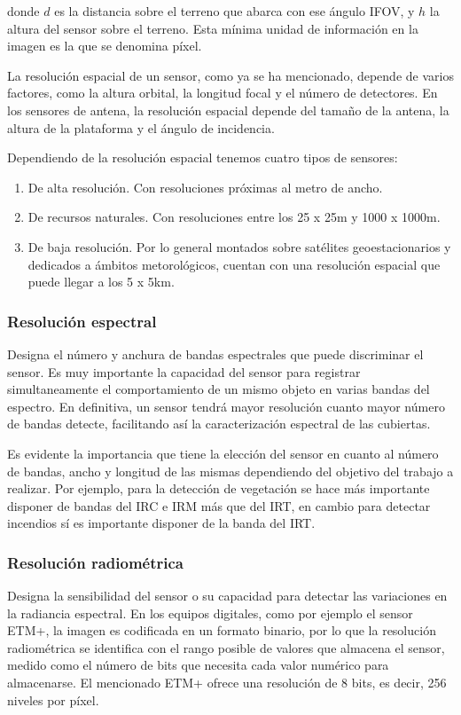 \noindent donde $d$ es la distancia sobre el terreno que abarca con ese ángulo \ac{IFOV}, y $h$ la altura del sensor sobre el terreno. Esta mínima unidad de información en la imagen es la que se denomina píxel.%

La resolución espacial de un sensor, como ya se ha mencionado, depende de varios factores, como la altura orbital, la longitud focal y el número de detectores. En los sensores de antena, la resolución espacial depende del tamaño de la antena, la altura de la plataforma y el ángulo de incidencia.%

Dependiendo de la resolución espacial tenemos cuatro tipos de sensores:
\begin{enumerate}
	\item De alta resolución. Con resoluciones próximas al metro de ancho.
	\item De recursos naturales. Con resoluciones entre los 25 x 25m y 1000 x 1000m.
	\item De baja resolución. Por lo general montados sobre satélites geoestacionarios y dedicados a ámbitos metorológicos, cuentan con una resolución espacial que puede llegar a los 5 x 5km.
\end{enumerate}

\subsubsection{Resolución espectral}
Designa el número y anchura de bandas espectrales que puede discriminar el sensor. Es muy importante la capacidad del sensor para registrar simultaneamente el comportamiento de un mismo objeto en varias bandas del espectro. En definitiva, un sensor tendrá mayor resolución cuanto mayor número de bandas detecte, facilitando así la caracterización espectral de las cubiertas.%

Es evidente la importancia que tiene la elección del sensor en cuanto al número de bandas, ancho y longitud de las mismas dependiendo del objetivo del trabajo a realizar. Por ejemplo, para la detección de vegetación se hace más importante disponer de bandas del \ac{IRC} e \ac{IRM} más que del \ac{IRT}, en cambio para detectar incendios sí es importante disponer de la banda del \ac{IRT}.

\subsubsection{Resolución radiométrica}
Designa la sensibilidad del sensor o su capacidad para detectar las variaciones en la radiancia espectral. En los equipos digitales, como por ejemplo el sensor \ac{ETM+}, la imagen es codificada en un formato binario, por lo que la resolución radiométrica se identifica con el rango posible de valores que almacena el sensor, medido como el número de bits que necesita cada valor numérico para almacenarse. El mencionado \ac{ETM+} ofrece una resolución de 8 bits, es decir, 256 niveles por píxel.%

